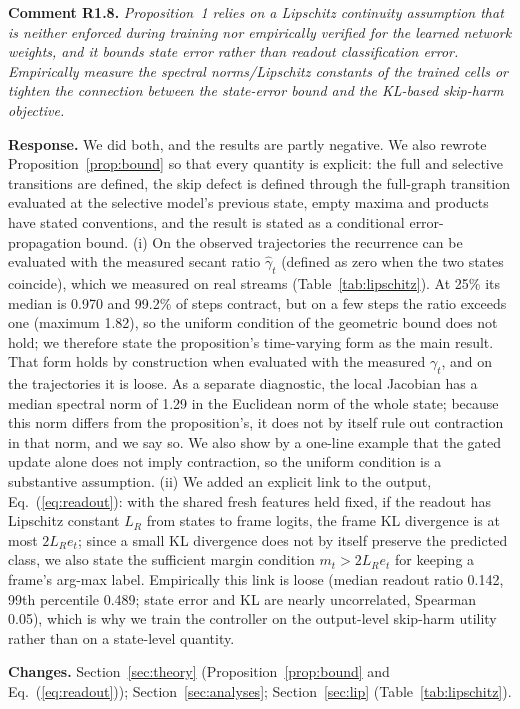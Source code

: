 \documentclass[11pt]{article}
\newcommand{\rc}[2]{\par\medskip\noindent\colorbox{black!6}{\parbox{\dimexpr\linewidth-2\fboxsep}{\textbf{Comment #1.} \itshape #2}}\par}
\newcommand{\resp}{\par\noindent\textbf{Response.} }
\newcommand{\chg}{\par\noindent\textbf{Changes.} }
\begin{document}
\rc{R1.8}{Proposition~1 relies on a Lipschitz continuity assumption that is neither enforced during training nor empirically verified for the learned network weights, and it bounds state error rather than readout classification error. Empirically measure the spectral norms/Lipschitz constants of the trained cells or tighten the connection between the state-error bound and the KL-based skip-harm objective.}
\resp We did both, and the results are partly negative. We also rewrote Proposition~\ref{prop:bound} so that every quantity is explicit: the full and selective transitions are defined, the skip defect is defined through the full-graph transition evaluated at the selective model's previous state, empty maxima and products have stated conventions, and the result is stated as a conditional error-propagation bound. (i) On the observed trajectories the recurrence can be evaluated with the measured secant ratio $\hat\gamma_t$ (defined as zero when the two states coincide), which we measured on real streams (Table~\ref{tab:lipschitz}). At 25\% its median is 0.970 and 99.2\% of steps contract, but on a few steps the ratio exceeds one (maximum 1.82), so the uniform condition of the geometric bound does not hold; we therefore state the proposition's time-varying form as the main result. That form holds by construction when evaluated with the measured $\gamma_t$, and on the trajectories it is loose. As a separate diagnostic, the local Jacobian has a median spectral norm of 1.29 in the Euclidean norm of the whole state; because this norm differs from the proposition's, it does not by itself rule out contraction in that norm, and we say so. We also show by a one-line example that the gated update alone does not imply contraction, so the uniform condition is a substantive assumption. (ii) We added an explicit link to the output, Eq.~(\ref{eq:readout}): with the shared fresh features held fixed, if the readout has Lipschitz constant $L_R$ from states to frame logits, the frame KL divergence is at most $2L_Re_t$; since a small KL divergence does not by itself preserve the predicted class, we also state the sufficient margin condition $m_t>2L_Re_t$ for keeping a frame's arg-max label. Empirically this link is loose (median readout ratio 0.142, 99th percentile 0.489; state error and KL are nearly uncorrelated, Spearman 0.05), which is why we train the controller on the output-level skip-harm utility rather than on a state-level quantity.
\chg Section~\ref{sec:theory} (Proposition~\ref{prop:bound} and Eq.~(\ref{eq:readout})); Section~\ref{sec:analyses}; Section~\ref{sec:lip} (Table~\ref{tab:lipschitz}).
\end{document}
